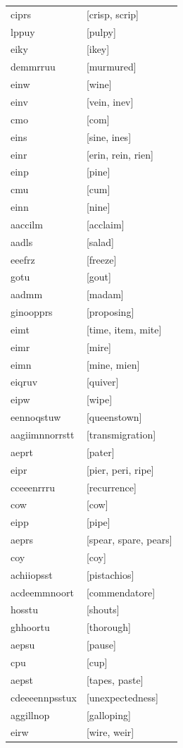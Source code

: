 \documentclass{article}
\begin{document}
\begin{tabular}{ll}
ciprs & [crisp, scrip] \\
lppuy & [pulpy] \\
eiky & [ikey] \\
demmrruu & [murmured] \\
einw & [wine] \\
einv & [vein, inev] \\
cmo & [com] \\
eins & [sine, ines] \\
einr & [erin, rein, rien] \\
einp & [pine] \\
cmu & [cum] \\
einn & [nine] \\
aaccilm & [acclaim] \\
aadls & [salad] \\
eeefrz & [freeze] \\
gotu & [gout] \\
aadmm & [madam] \\
ginoopprs & [proposing] \\
eimt & [time, item, mite] \\
eimr & [mire] \\
eimn & [mine, mien] \\
eiqruv & [quiver] \\
eipw & [wipe] \\
eennoqstuw & [queenstown] \\
aagiimnnorrstt & [transmigration] \\
aeprt & [pater] \\
eipr & [pier, peri, ripe] \\
cceeenrrru & [recurrence] \\
cow & [cow] \\
eipp & [pipe] \\
aeprs & [spear, spare, pears] \\
coy & [coy] \\
achiiopsst & [pistachios] \\
acdeemmnoort & [commendatore] \\
hosstu & [shouts] \\
ghhoortu & [thorough] \\
aepsu & [pause] \\
cpu & [cup] \\
aepst & [tapes, paste] \\
cdeeeennpsstux & [unexpectedness] \\
aggillnop & [galloping] \\
eirw & [wire, weir] \\

\end{tabular}
\end{document}
